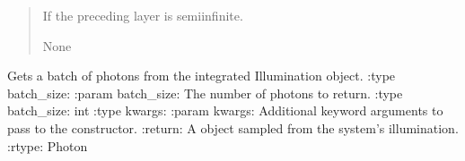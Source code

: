 \documentclass[letterpaper,10pt,english]{sphinxmanual}
\begin{document}
\begin{fulllineitems}
\begin{fulllineitems}
\begin{quote}
\begin{description}
\begin{itemize}
\end{itemize}

\sphinxAtStartPar
{} \textendash{} If the preceding layer is semi\sphinxhyphen{}infinite.

\sphinxAtStartPar
{}

\sphinxAtStartPar
None

\end{description}\end{quote}

\end{fulllineitems}


\begin{fulllineitems}
\label{\detokenize{generated/photon_canon.optics:photon_canon.optics.System.beam}}
\pysigstartsignatures
\pysiglinewithargsret
{}
{\sphinxparamcomma {}}
{}
\pysigstopsignatures
\sphinxAtStartPar
Gets a batch of photons from the integrated Illumination object.
:type batch\_size: 
:param batch\_size: The number of photons to return.
:type batch\_size: int
:type kwargs: 
:param kwargs: Additional keyword arguments to pass to the  constructor.
:return: A  object sampled from the system’s illumination.
:rtype: Photon

\end{fulllineitems}


\begin{fulllineitems}
\label{\detokenize{generated/photon_canon.optics:photon_canon.optics.System.boundaries}}
\pysigstartsignatures
\pysigline
{}
\pysigstopsignatures
\end{fulllineitems}


\end{fulllineitems}
\end{document}
